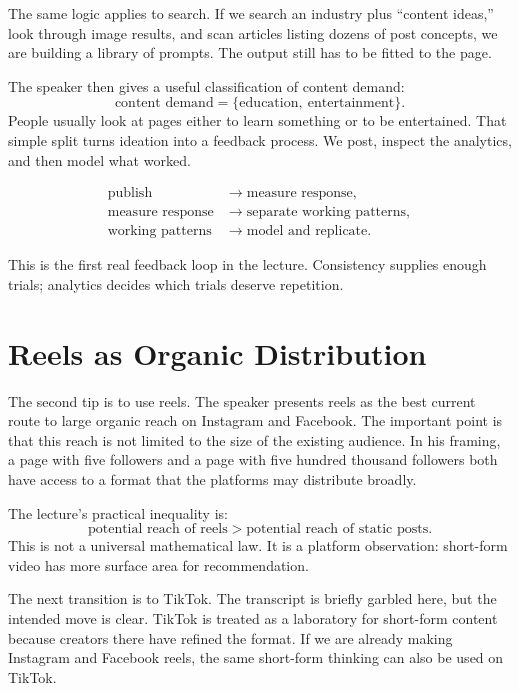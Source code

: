 The same logic applies to search. If we search an industry plus ``content ideas,'' look through image results, and scan articles listing dozens of post concepts, we are building a library of prompts. The output still has to be fitted to the page.

The speaker then gives a useful classification of content demand:
\begin{equation}
\text{content demand}
=
\{\text{education},\ \text{entertainment}\}.
\end{equation}
People usually look at pages either to learn something or to be entertained. That simple split turns ideation into a feedback process. We post, inspect the analytics, and then model what worked.

\begin{align}
\text{publish} &\longrightarrow \text{measure response},\\
\text{measure response} &\longrightarrow \text{separate working patterns},\\
\text{working patterns} &\longrightarrow \text{model and replicate}.
\end{align}

This is the first real feedback loop in the lecture. Consistency supplies enough trials; analytics decides which trials deserve repetition.

\section{Reels as Organic Distribution}

The second tip is to use reels. The speaker presents reels as the best current route to large organic reach on Instagram and Facebook. The important point is that this reach is not limited to the size of the existing audience. In his framing, a page with five followers and a page with five hundred thousand followers both have access to a format that the platforms may distribute broadly.

The lecture's practical inequality is:
\begin{equation}
\text{potential reach of reels}
>
\text{potential reach of static posts}.
\end{equation}
This is not a universal mathematical law. It is a platform observation: short-form video has more surface area for recommendation.

The next transition is to TikTok. The transcript is briefly garbled here, but the intended move is clear. TikTok is treated as a laboratory for short-form content because creators there have refined the format. If we are already making Instagram and Facebook reels, the same short-form thinking can also be used on TikTok.

